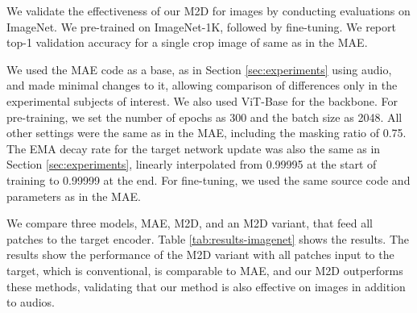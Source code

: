 \documentclass{article}
\begin{document}
We validate the effectiveness of our M2D for images by conducting evaluations on ImageNet\cite{ImageNet}.
We pre-trained on ImageNet-1K\cite{ImageNet}, followed by fine-tuning. We report top-1 validation accuracy for a single crop image of  same as in the MAE\cite{he2022masked}.

We used the MAE code as a base, as in Section \ref{sec:experiments} using audio, and made minimal changes to it, allowing comparison of differences only in the experimental subjects of interest. We also used ViT-Base\cite{ViT} for the backbone.
For pre-training, we set the number of epochs as 300 and the batch size as 2048. All other settings were the same as in the MAE, including the masking ratio of 0.75. The EMA decay rate   for the target network update was also the same as in Section \ref{sec:experiments}, linearly interpolated from 0.99995 at the start of training to 0.99999 at the end.
For fine-tuning, we used the same source code and parameters as in the MAE.

We compare three models, MAE, M2D, and an M2D variant, that feed all patches to the target encoder. Table \ref{tab:results-imagenet} shows the results. The results show the performance of the M2D variant with all patches input to the target, which is conventional, is comparable to MAE, and our M2D outperforms these methods, validating that our method is also effective on images in addition to audios.

\begin{table}[tbh!]
\caption{Fine-tuning results on ImageNet-1K.}
\label{tab:results-imagenet}
\centering
{}
\vspace{-15pt}
\end{table}
\end{document}
